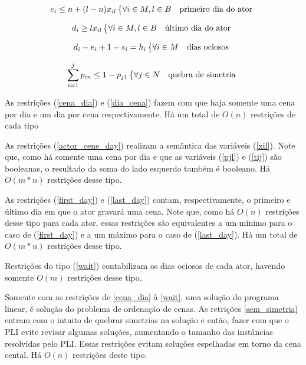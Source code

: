 \documentclass[a4paper,11pt]{article}
\begin{document}
\begin{equation}
  e_{i} \leq n + (l-n)x_{il} \begin{dcases*} \forall i \in M, l \in B & primeiro dia do ator \end{dcases*}
  \label{first_day}
\end{equation}

\begin{equation}
  d_{i} \geq lx_{il} \begin{dcases*} \forall i \in M, l \in B & último dia do ator \end{dcases*}
  \label{last_day}
\end{equation}

\begin{equation}
  d_{i} - e_i + 1 - s_i = h_i \begin{dcases*} \forall i \in M & dias ociosos \end{dcases*}
  \label{wait}
\end{equation}

\begin{equation}
  \sum_{i=1}^j p_{in} \leq 1 - p_{j1} \begin{dcases*} \forall j \in N & quebra de simetria \end{dcases*}
  \label{sem_simetria}
\end{equation}

As restrições (\ref{cena_dia}) e (\ref{dia_cena}) fazem com que haja somente uma
cena por dia e um dia por cena respectivamente. Há um total de $O(n)$ restrições
de cada tipo

As restrições (\ref{actor_cene_day}) realizam a semântica das variáveis (\ref{xil}).
Note que, como há somente uma cena por dia e que as variáveis (\ref{pjl}) e (\ref{tij})
são booleanas, o resultado da soma do lado esquerdo também é booleano. Há $O(m*n)$
restrições desse tipo.

As restrições (\ref{first_day}) e (\ref{last_day}) contam, respectivamente, o
primeiro e último dia em que o ator gravará uma cena. Note que, como há $O(n)$
restrições desse tipo para cada ator, essas restrições são equivalentes a um
mínimo para o caso de (\ref{first_day}) e a um máximo para o caso de (\ref{last_day}).
Há um total de $O(m*n)$ restrições desse tipo.

Restrições do tipo (\ref{wait}) contabilizam os dias ociosos de cada ator, havendo
somente $O(m)$ restrições desse tipo.

Somente com as restrições de \ref{cena_dia} à \ref{wait}, uma solução do programa
linear, é solução do problema de ordenação de cenas. As retrições \ref{sem_simetria}
entram com o intuito de quebrar simetrias na solução e então, fazer com que o PLI
evite revisar algumas soluções, aumentando o tamanho das instâncias resolvidas pelo PLI.
Essas restrições evitam soluções espelhadas em torno da cena cental. Há $O(n)$ restrições
deste tipo.
\end{document}
